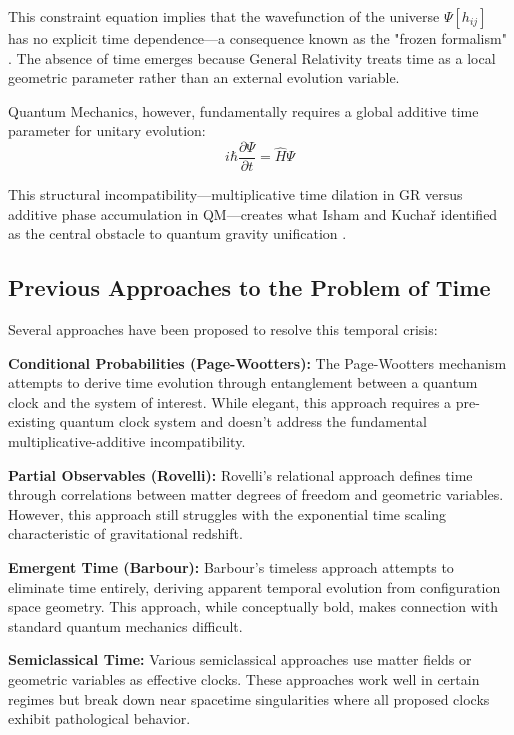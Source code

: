 \documentclass[12pt,a4paper]{article}
\begin{document}
This constraint equation implies that the wavefunction of the universe $\Psi[h_{ij}]$ has no explicit time dependence—a consequence known as the "frozen formalism" \cite{Barbour1999}. The absence of time emerges because General Relativity treats time as a local geometric parameter rather than an external evolution variable.

Quantum Mechanics, however, fundamentally requires a global additive time parameter for unitary evolution:
\begin{equation}
i\hbar \frac{\partial \Psi}{\partial t} = \hat{H} \Psi
\label{eq:schrodinger}
\end{equation}

This structural incompatibility—multiplicative time dilation in GR versus additive phase accumulation in QM—creates what Isham and Kuchař identified as the central obstacle to quantum gravity unification \cite{Kuchar1992}.

\subsection{Previous Approaches to the Problem of Time}

Several approaches have been proposed to resolve this temporal crisis:

\textbf{Conditional Probabilities (Page-Wootters):} The Page-Wootters mechanism \cite{Page1983} attempts to derive time evolution through entanglement between a quantum clock and the system of interest. While elegant, this approach requires a pre-existing quantum clock system and doesn't address the fundamental multiplicative-additive incompatibility.

\textbf{Partial Observables (Rovelli):} Rovelli's relational approach \cite{Rovelli2002} defines time through correlations between matter degrees of freedom and geometric variables. However, this approach still struggles with the exponential time scaling characteristic of gravitational redshift.

\textbf{Emergent Time (Barbour):} Barbour's timeless approach \cite{Barbour1999} attempts to eliminate time entirely, deriving apparent temporal evolution from configuration space geometry. This approach, while conceptually bold, makes connection with standard quantum mechanics difficult.

\textbf{Semiclassical Time:} Various semiclassical approaches use matter fields or geometric variables as effective clocks. These approaches work well in certain regimes but break down near spacetime singularities where all proposed clocks exhibit pathological behavior.
\end{document}
